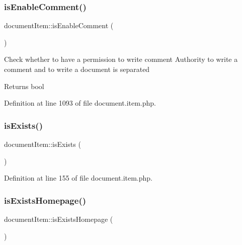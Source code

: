 \mbox{\label{classdocumentItem_aff71a0f39ddc720c21c5cf39805b31a8}} 
\subsubsection{\texorpdfstring{is\+Enable\+Comment()}{isEnableComment()}}
{\footnotesize\ttfamily document\+Item\+::is\+Enable\+Comment (\begin{DoxyParamCaption}{ }\end{DoxyParamCaption})}

Check whether to have a permission to write comment Authority to write a comment and to write a document is separated \begin{DoxyReturn}{Returns}
bool 
\end{DoxyReturn}


Definition at line 1093 of file document.\+item.\+php.

\mbox{\label{classdocumentItem_a91139891022f05e19b2f685ed25e000b}} 
\subsubsection{\texorpdfstring{is\+Exists()}{isExists()}}
{\footnotesize\ttfamily document\+Item\+::is\+Exists (\begin{DoxyParamCaption}{ }\end{DoxyParamCaption})}



Definition at line 155 of file document.\+item.\+php.

\mbox{\label{classdocumentItem_a7cc882ce0da6cbe675be8fdb980a0d97}} 
\subsubsection{\texorpdfstring{is\+Exists\+Homepage()}{isExistsHomepage()}}
{\footnotesize\ttfamily document\+Item\+::is\+Exists\+Homepage (\begin{DoxyParamCaption}{ }\end{DoxyParamCaption})}



